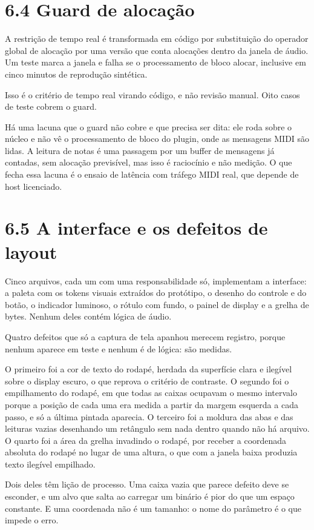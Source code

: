 \documentclass[12pt,a4paper]{article}
\begin{document}
\section*{6.4 Guard de alocação}

A restrição de tempo real é transformada em código por substituição do operador global de alocação por uma versão que conta alocações dentro da janela de áudio. Um teste marca a janela e falha se o processamento de bloco alocar, inclusive em cinco minutos de reprodução sintética.


Isso é o critério de tempo real virando código, e não revisão manual. Oito casos de teste cobrem o guard.


Há uma lacuna que o guard não cobre e que precisa ser dita: ele roda sobre o núcleo e não vê o processamento de bloco do plugin, onde as mensagens MIDI são lidas. A leitura de notas é uma passagem por um buffer de mensagens já contadas, sem alocação previsível, mas isso é raciocínio e não medição. O que fecha essa lacuna é o ensaio de latência com tráfego MIDI real, que depende de host licenciado.


\section*{6.5 A interface e os defeitos de layout}

Cinco arquivos, cada um com uma responsabilidade só, implementam a interface: a paleta com os tokens visuais extraídos do protótipo, o desenho do controle e do botão, o indicador luminoso, o rótulo com fundo, o painel de display e a grelha de bytes. Nenhum deles contém lógica de áudio.


Quatro defeitos que só a captura de tela apanhou merecem registro, porque nenhum aparece em teste e nenhum é de lógica: são medidas.


O primeiro foi a cor de texto do rodapé, herdada da superfície clara e ilegível sobre o display escuro, o que reprova o critério de contraste. O segundo foi o empilhamento do rodapé, em que todas as caixas ocupavam o mesmo intervalo porque a posição de cada uma era medida a partir da margem esquerda a cada passo, e só a última pintada aparecia. O terceiro foi a moldura das abas e das leituras vazias desenhando um retângulo sem nada dentro quando não há arquivo. O quarto foi a área da grelha invadindo o rodapé, por receber a coordenada absoluta do rodapé no lugar de uma altura, o que com a janela baixa produzia texto ilegível empilhado.


Dois deles têm lição de processo. Uma caixa vazia que parece defeito deve se esconder, e um alvo que salta ao carregar um binário é pior do que um espaço constante. E uma coordenada não é um tamanho: o nome do parâmetro é o que impede o erro.
\end{document}
